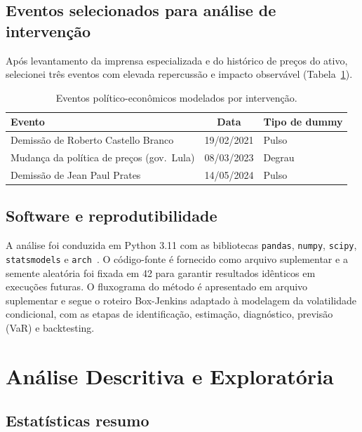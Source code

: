 \documentclass[12pt, a4paper]{article}
\begin{document}
\subsection{Eventos selecionados para análise de intervenção}

Após levantamento da imprensa especializada e do histórico de preços do ativo, selecionei três eventos com elevada repercussão e impacto observável (Tabela~\ref{tab:eventos}).

\begin{table}[H]
\centering
\caption{Eventos político-econômicos modelados por intervenção.}
\label{tab:eventos}
\begin{tabular}{lcl}
\toprule
Evento & Data & Tipo de dummy \\
\midrule
Demissão de Roberto Castello Branco        & 19/02/2021 & Pulso \\
Mudança da política de preços (gov.\ Lula) & 08/03/2023 & Degrau \\
Demissão de Jean Paul Prates               & 14/05/2024 & Pulso \\
\bottomrule
\end{tabular}
\end{table}

\subsection{Software e reprodutibilidade}

A análise foi conduzida em Python 3.11 com as bibliotecas \texttt{pandas}, \texttt{numpy}, \texttt{scipy}, \texttt{statsmodels} e \texttt{arch}~\cite{sheppard2024}. O código-fonte é fornecido como arquivo suplementar e a semente aleatória foi fixada em 42 para garantir resultados idênticos em execuções futuras. O fluxograma do método é apresentado em arquivo suplementar e segue o roteiro Box-Jenkins adaptado à modelagem da volatilidade condicional, com as etapas de identificação, estimação, diagnóstico, previsão (VaR) e backtesting.

\section{Análise Descritiva e Exploratória}
\label{sec:descritiva}

\subsection{Estatísticas resumo}
\end{document}
